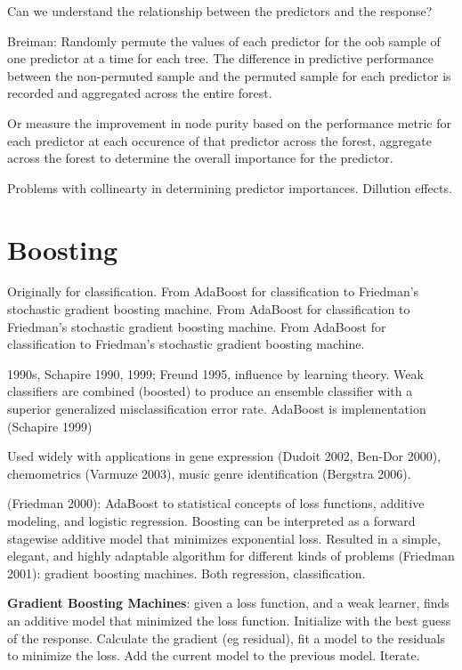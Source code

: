 \documentclass[]{article}
\begin{document}
Can we understand the relationship between the predictors and the
response?

Breiman: Randomly permute the values of each predictor for the oob
sample of one predictor at a time for each tree. The difference in
predictive performance between the non-permuted sample and the permuted
sample for each predictor is recorded and aggregated across the entire
forest.

Or measure the improvement in node purity based on the performance
metric for each predictor at each occurence of that predictor across the
forest, aggregate across the forest to determine the overall importance
for the predictor.

Problems with collinearty in determining predictor importances.
Dillution effects.

\section{Boosting}\label{boosting}

Originally for classification. From AdaBoost for classification to
Friedman's stochastic gradient boosting machine. From AdaBoost for
classification to Friedman's stochastic gradient boosting machine. From
AdaBoost for classification to Friedman's stochastic gradient boosting
machine.

1990s, Schapire 1990, 1999; Freund 1995, influence by learning theory.
Weak classifiers are combined (boosted) to produce an ensemble
classifier with a superior generalized misclassification error rate.
AdaBoost is implementation (Schapire 1999)

Used widely with applications in gene expression (Dudoit 2002, Ben-Dor
2000), chemometrics (Varmuze 2003), music genre identification (Bergstra
2006).

(Friedman 2000): AdaBoost to statistical concepts of loss functions,
additive modeling, and logistic regression. Boosting can be interpreted
as a forward stagewise additive model that minimizes exponential loss.
Resulted in a simple, elegant, and highly adaptable algorithm for
different kinds of problems (Friedman 2001): gradient boosting machines.
Both regression, classification.

\textbf{Gradient Boosting Machines}: given a loss function, and a weak
learner, finds an additive model that minimized the loss function.
Initialize with the best guess of the response. Calculate the gradient
(eg residual), fit a model to the residuals to minimize the loss. Add
the current model to the previous model. Iterate.
\end{document}
